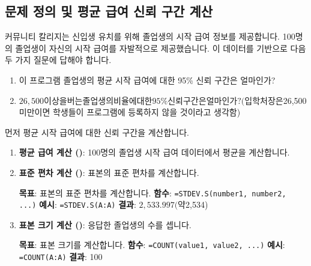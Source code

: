 \documentclass[11pt,a4paper]{article}
\theoremstyle{definition}
\newcommand{\code}[1]{\texttt{#1}}
\begin{document}
\begin{enumerate}
\begin{enumerate}
\subsection{문제 정의 및 평균 급여 신뢰 구간 계산}
커뮤니티 칼리지는 신입생 유치를 위해 졸업생의 시작 급여 정보를 제공합니다. 100명의 졸업생이 자신의 시작 급여를 자발적으로 제공했습니다. 이 데이터를 기반으로 다음 두 가지 질문에 답해야 합니다.
\begin{enumerate}
    \item 이 프로그램 졸업생의 평균 시작 급여에 대한 95\% 신뢰 구간은 얼마인가?
    \item $26,500 이상을 버는 졸업생의 비율에 대한 95\% 신뢰 구간은 얼마인가? (입학처장은 $26,500 미만이면 학생들이 프로그램에 등록하지 않을 것이라고 생각함)
\end{enumerate}

먼저 평균 시작 급여에 대한 신뢰 구간을 계산합니다.

\begin{enumerate}
    \item \textbf{평균 급여 계산 ()}:
    100명의 졸업생 시작 급여 데이터에서 평균을 계산합니다.

    \item \textbf{표준 편차 계산 ()}:
    표본의 표준 편차를 계산합니다.
    \begin{examplebox}[title=Excel STDEV.S 함수 사용법]
        \textbf{목표}: 표본의 표준 편차를 계산합니다.
        \textbf{함수}: \code{=STDEV.S(number1, number2, ...)}
        \textbf{예시}: \code{=STDEV.S(A:A)}
        \textbf{결과}: $2,533.997 (약 $2,534)
    \end{examplebox}

    \item \textbf{표본 크기 계산 ()}:
    응답한 졸업생의 수를 셉니다.
    \begin{examplebox}[title=Excel COUNT 함수 사용법]
        \textbf{목표}: 표본 크기를 계산합니다.
        \textbf{함수}: \code{=COUNT(value1, value2, ...)}
        \textbf{예시}: \code{=COUNT(A:A)}
        \textbf{결과}: 100
    \end{examplebox}


\end{enumerate}
\end{enumerate}
\end{enumerate}
\end{document}
